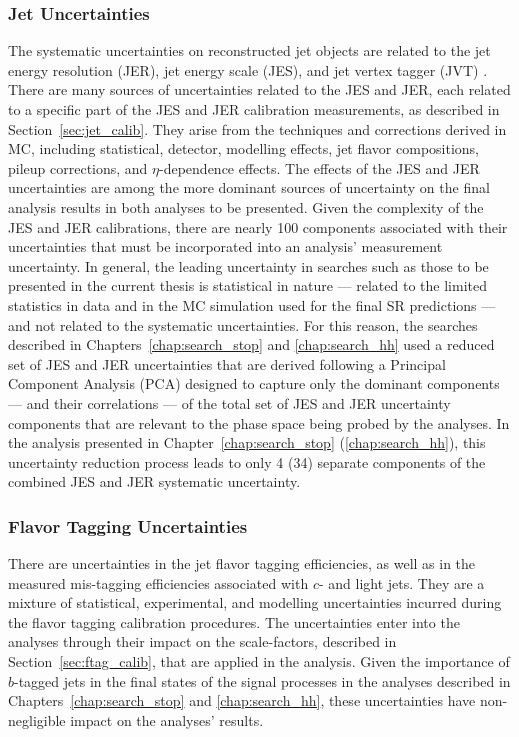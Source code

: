 \subsubsection{Jet Uncertainties}
The systematic uncertainties on reconstructed jet objects are related to the jet energy
resolution (JER), jet energy scale (JES), and jet vertex tagger (JVT) {\color{red}{don't forget to describe JVT}}.
There are many sources of uncertainties related to the JES and JER, each related to a specific
part of the JES and JER calibration measurements, as described in Section~\ref{sec:jet_calib}.
They arise from the techniques and corrections derived in MC, including statistical, detector,
modelling effects, jet flavor compositions, pileup corrections, and $\eta$-dependence effects.
The effects of the JES and JER uncertainties are among the more dominant sources of uncertainty
on the final analysis results in both analyses to be presented.
Given the complexity of the JES and JER calibrations, there are nearly 100 components associated with their uncertainties
that must be incorporated into an analysis' measurement uncertainty.
In general, the leading uncertainty in searches such as those to be presented in the current thesis
is statistical in nature --- related to the limited statistics in data and in the MC simulation used
for the final SR predictions ---  and not related to the systematic uncertainties.
For this reason, the searches described in Chapters~\ref{chap:search_stop} and \ref{chap:search_hh}
used a reduced set of JES and JER uncertainties that are derived following a Principal Component Analysis (PCA)
designed to capture only the dominant components --- and their correlations --- of the total set of JES and JER uncertainty components
that are relevant to the phase space being probed by the analyses.
In the analysis presented in Chapter~\ref{chap:search_stop} (\ref{chap:search_hh}), this uncertainty reduction
process leads to only 4 (34) separate components of the combined JES and JER systematic uncertainty.

\subsubsection{Flavor Tagging Uncertainties}
There are uncertainties in the jet flavor tagging efficiencies, as well as in
the measured mis-tagging efficiencies associated with $c$- and light jets.
They are a mixture of statistical, experimental, and modelling uncertainties
incurred during the flavor tagging calibration procedures.
The uncertainties enter into the analyses through their impact on the scale-factors,
described in Section~\ref{sec:ftag_calib},
that are applied in the analysis.
Given the importance of $b$-tagged jets in the final states of the signal processes
in the analyses described in Chapters~\ref{chap:search_stop} and \ref{chap:search_hh},
these uncertainties have non-negligible impact on the analyses' results.

